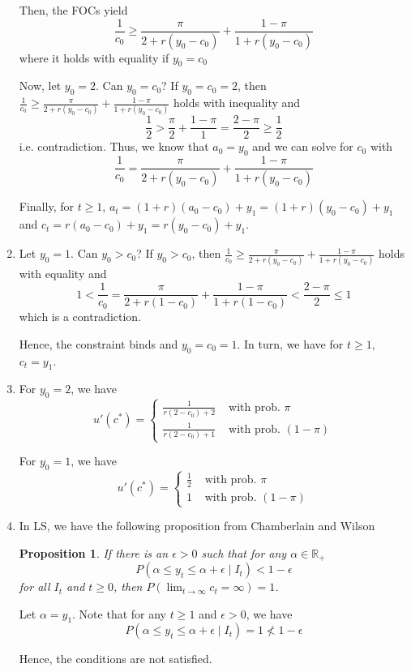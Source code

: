 \documentclass[12pt]{article}
\newtheorem{proposition}[theorem]{Proposition}
\newcommand{\field}[1]{\mathbb{#1}}
\newcommand{\R}{\field{R}} %
\newcommand{\1}{{\bf 1}} %
\newcommand{\mat}[1]{\begin{matrix}#1\end{matrix}}
\begin{document}
\begin{enumerate}[(1)]
Then, the FOCs yield
\[
\frac{1}{c_0}\geq \frac{\pi}{2 + r(y_0-c_0)} + \frac{1-\pi}{1 + r(y_0-c_0)}
\]
where it holds with equality if $y_0=c_0$

Now, let $y_0=2$. Can $y_0=c_0$? If $y_0=c_0=2$, then $\frac{1}{c_0}\geq \frac{\pi}{2 + r(y_0-c_0)} + \frac{1-\pi}{1 + r(y_0-c_0)}$ holds with inequality and
\[
\frac{1}{2}> \frac{\pi}{2} + \frac{1-\pi}{1} = \frac{2-\pi}{2} \geq \frac{1}{2}
\]
i.e. contradiction. Thus, we know that $a_0=y_0$ and we can solve for $c_0$ with
\[
\frac{1}{c_0}= \frac{\pi}{2 + r(y_0-c_0)} + \frac{1-\pi}{1 + r(y_0-c_0)}
\]

Finally, for $t\geq 1$, $a_t = (1+r)(a_0-c_0)+y_1=(1+r)(y_0-c_0)+y_1$ and $c_t = r(a_0-c_0)+y_1=r(y_0-c_0)+y_1$. 
	\item
	
	Let $y_0=1$. Can $y_0>c_0$? If $y_0>c_0$, then $\frac{1}{c_0}\geq \frac{\pi}{2 + r(y_0-c_0)} + \frac{1-\pi}{1 + r(y_0-c_0)}$ holds with equality and
	\[
	1<\frac{1}{c_0}= \frac{\pi}{2 + r(1-c_0)} + \frac{1-\pi}{1 + r(1-c_0)}< \frac{2-\pi}{2} \leq  1
	\]
	which is a contradiction.
	
	Hence, the constraint binds and $y_0=c_0=1$. In turn, we have for $t\geq 1$, $c_t=y_1$. 
	\item
	
	For $y_0=2$, we have
	\[
	u'(c^*) = \left\lbrace \mat{\frac{1}{r(2-c_0)+2} & \text{ with prob. }\pi\\
	\frac{1}{r(2-c_0)+1} & \text{ with prob. }(1-\pi)} \right. 
	\]
	
	For $y_0=1$, we have
	\[
	u'(c^*) = \left\lbrace \mat{\frac{1}{2} & \text{ with prob. }\pi\\
		1 & \text{ with prob. }(1-\pi)} \right. 
	\]
	\item
	
	In LS, we have the following proposition from Chamberlain and Wilson
	\begin{proposition}
		If there is an $\epsilon>0$ such that for any $\alpha\in \R_+$\[
		P(\alpha\leq y_t\leq \alpha +\epsilon\mid I_t)<1-\epsilon
		\]
		for all $I_t$ and $t\geq 0$, then $P(\lim_{t\to \infty}c_t =\infty) =1$.
	\end{proposition}

Let $\alpha = y_1$. Note that for any $t\geq 1$ and $\epsilon>0$, we have 
\[
P(\alpha\leq y_t\leq \alpha +\epsilon\mid I_t) = 1 \not< 1-\epsilon
\]

Hence, the conditions are not satisfied.
\end{enumerate}
\end{document}
